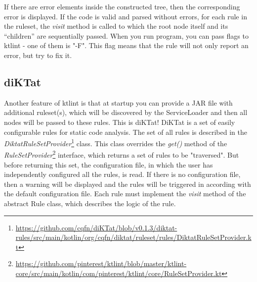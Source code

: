 If there are error elements inside the constructed tree, then the corresponding error is displayed. If the code is valid and parsed without errors, for each rule in the ruleset, the \textsl{visit} method is called to which the root node itself and its “children” are sequentially passed.
When you run program, you can pass flags to ktlint - one of them is "-F". This flag means that the rule will not only report an error, but try to fix it.

\subsection{diKTat}
\par
Another feature of ktlint is that at startup you can provide a JAR file with additional ruleset(s), which will be discovered by the ServiceLoader and then all nodes will be passed to these rules. This is diKTat! DiKTat is a set of easily configurable rules for static code analysis. The set of all rules is described in the \textsl{DiktatRuleSetProvider}\footnote{\url{https://github.com/cqfn/diKTat/blob/v0.1.3/diktat-rules/src/main/kotlin/org/cqfn/diktat/ruleset/rules/DiktatRuleSetProvider.kt}} class. This class overrides the \textsl{get()} method of the \textsl{RuleSetProvider}\footnote{\url{https://github.com/pinterest/ktlint/blob/master/ktlint-core/src/main/kotlin/com/pinterest/ktlint/core/RuleSetProvider.kt}} interface, which returns a set of rules to be "traversed". But before returning this set, the configuration file, in which the user has independently configured all the rules, is read. If there is no configuration file, then a warning will be displayed and the rules will be triggered in according with the default configuration file. 
Each rule must implement the \textsl{visit} method of the abstract Rule class, which describes the logic of the rule.

